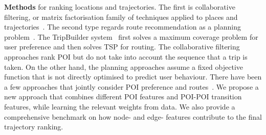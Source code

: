 {\bf Methods} for ranking locations and trajectories.
The first is collaborative filtering, or matrix factorisation family of techniques applied to places and trajectories~\cite{shi2011personalized,ijcai13,zhang2015location}. The second type regards route recommendation as a planning problem~\cite{gioniswsdm14,ijcai15}.
The TripBuilder system~\cite{brilhante2013shall} first solves a maximum coverage problem for user preference and then solves TSP for routing. The collaborative filtering approaches rank POI but do not take into account the sequence that a trip is taken. On the other hand, the planning approaches assume a fixed objective function that is not directly optimised to predict user behaviour. There have been a few approaches that jointly consider POI preference and routes~\cite{lu2012personalized, kurashima2010geotag,chen2015tripplanner}.
We propose a new approach that combines different POI features and POI-POI transition features, while learning the relevant weights from data. We also provide a comprehensive benchmark on how node- and edge- features contribute to the final trajectory ranking.




